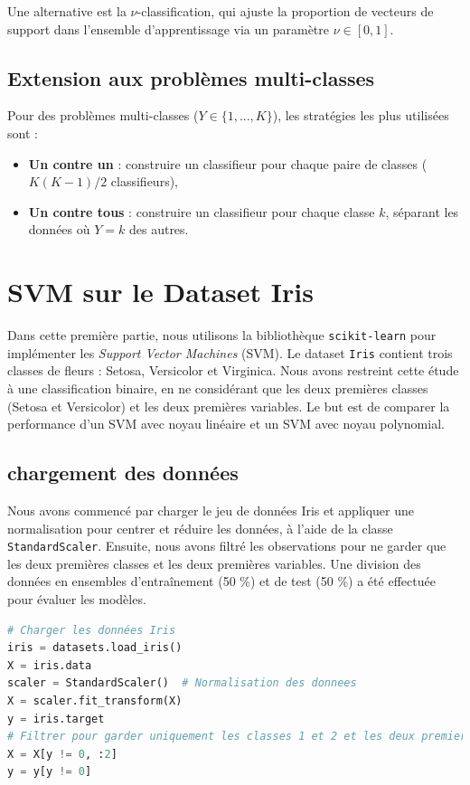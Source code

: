 \documentclass[12pt,a4paper]{report}
\begin{document}
Une alternative est la \(\nu\)-classification, qui ajuste la proportion de vecteurs de support dans l’ensemble d’apprentissage via un paramètre \( \nu \in [0, 1] \).

\subsection{Extension aux problèmes multi-classes}

Pour des problèmes multi-classes (\( Y \in \{1, ..., K\} \)), les stratégies les plus utilisées sont :
\begin{itemize}
    \item \textbf{Un contre un} : construire un classifieur pour chaque paire de classes (\( K(K-1)/2 \) classifieurs),
    \item \textbf{Un contre tous} : construire un classifieur pour chaque classe \( k \), séparant les données où \( Y = k \) des autres.
\end{itemize}
\section{SVM sur le Dataset Iris}

Dans cette première partie, nous utilisons la bibliothèque \texttt{scikit-learn} pour implémenter les \textit{Support Vector Machines} (SVM). Le dataset \texttt{Iris} contient trois classes de fleurs : Setosa, Versicolor et Virginica. Nous avons restreint cette étude à une classification binaire, en ne considérant que les deux premières classes (Setosa et Versicolor) et les deux premières variables. Le but est de comparer la performance d’un SVM avec noyau linéaire et un SVM avec noyau polynomial.


\subsection{chargement des données}

Nous avons commencé par charger le jeu de données Iris et appliquer une normalisation pour centrer et réduire les données, à l'aide de la classe \texttt{StandardScaler}. Ensuite, nous avons filtré les observations pour ne garder que les deux premières classes et les deux premières variables. Une division des données en ensembles d'entraînement (50 \%) et de test (50 \%) a été effectuée pour évaluer les modèles.

\begin{lstlisting}[language=Python, caption=Chargement des donnees et pretraitement]
# Charger les données Iris
iris = datasets.load_iris()
X = iris.data
scaler = StandardScaler()  # Normalisation des donnees
X = scaler.fit_transform(X)
y = iris.target
# Filtrer pour garder uniquement les classes 1 et 2 et les deux premieres variables
X = X[y != 0, :2]
y = y[y != 0]
\end{lstlisting}
\end{document}
